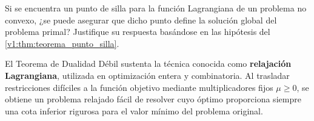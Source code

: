 \begin{controlbox}
    Si se encuentra un punto de silla para la función Lagrangiana de un problema no convexo, ¿se puede asegurar que dicho punto define la solución global del problema primal? Justifique su respuesta basándose en las hipótesis del \cref{v1:thm:teorema_punto_silla}.
\end{controlbox}

\begin{notabox}
    El Teorema de Dualidad Débil sustenta la técnica conocida como \textbf{relajación Lagrangiana}, utilizada en optimización entera y combinatoria. Al trasladar restricciones difíciles a la función objetivo mediante multiplicadores fijos $\mu \ge 0$, se obtiene un problema relajado fácil de resolver cuyo óptimo proporciona siempre una cota inferior rigurosa para el valor mínimo del problema original.
\end{notabox}